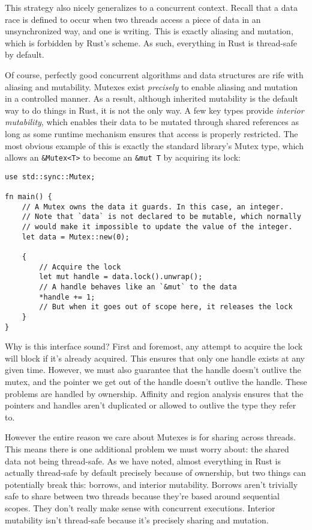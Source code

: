 This strategy also nicely generalizes to a concurrent context. Recall that a data race is
defined to occur when two threads access a piece of data in an unsynchronized
way, and one is writing. This is exactly aliasing and mutation, which is
forbidden by Rust's scheme. As such, everything in Rust is thread-safe by default.

Of course, perfectly good concurrent algorithms and data structures are rife with aliasing and
mutability. Mutexes exist \emph{precisely} to enable aliasing and mutation in a
controlled manner. As a result, although inherited mutability is the default way to do things in
Rust, it is not the only way. A few key types provide \emph{interior mutability},
which enables their data to be mutated through shared references as long as some
runtime mechanism ensures that access is properly restricted. The most
obvious example of this is exactly the standard library's Mutex type, which
allows an \texttt{&Mutex<T>} to become an \texttt{&mut T} by
acquiring its lock:

\begin{verbatim}
use std::sync::Mutex;

fn main() {
    // A Mutex owns the data it guards. In this case, an integer.
    // Note that `data` is not declared to be mutable, which normally
    // would make it impossible to update the value of the integer.
    let data = Mutex::new(0);

    {
        // Acquire the lock
        let mut handle = data.lock().unwrap();
        // A handle behaves like an `&mut` to the data
        *handle += 1;
        // But when it goes out of scope here, it releases the lock
    }
}
\end{verbatim}

Why is this interface sound? First and foremost, any attempt to acquire the
lock will block if it's already acquired. This ensures that only one handle
exists at any given time. However, we must also guarantee that the handle doesn't
outlive the mutex, and the pointer we get out of the handle doesn't outlive the
handle. These problems are handled by ownership. Affinity and region analysis
ensures that the pointers and handles aren't duplicated or allowed to outlive
the type they refer to.

However the entire reason we care about Mutexes is for sharing across threads.
This means there is one additional problem we must worry about: the shared
data not being thread-safe. As we have noted, almost everything in Rust is
actually thread-safe by default precisely because of ownership, but two things
can potentially break this: borrows, and interior mutability. Borrows aren't
trivially safe to share between two threads because they're based around
sequential scopes. They don't really make sense with concurrent executions.
Interior mutability isn't thread-safe because it's precisely sharing and mutation.

